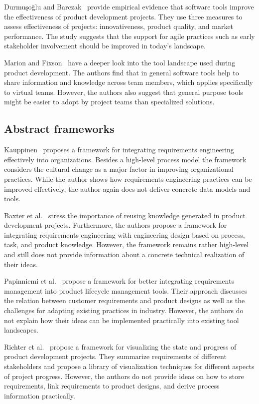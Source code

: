     Durmuşoğlu and Barczak~\cite{DURMUSOGLU2011321} provide empirical evidence that software tools improve the effectiveness of product development projects.
    They use three measures to assess effectiveness of projects: innovativeness, product quality, and market performance.
    The study suggests that the support for agile practices such as early stakeholder involvement should be improved in today's landscape.
    
    Marion and Fixson~\cite{marion_fixson_2019} have a deeper look into the tool landscape used during product development.
    The authors find that in general software tools help to share information and knowledge across team members, which applies specifically to virtual teams.
    However, the authors also suggest that general purpose tools might be easier to adopt by project teams than specialized solutions.
    
    \subsection*{Abstract frameworks}
    Kauppinen~\cite{Kauppinen2005} proposes a framework for integrating requirements engineering effectively into organizations.
    Besides a high-level process model the framework considers the cultural change as a major factor in improving organizational practices.
    While the author shows how requirements engineering practices can be improved effectively, the author again does not deliver concrete data models and tools.
    
    Baxter et al.~\cite{BAXTER2008585} stress the importance of reusing knowledge generated in product development projects.
    Furthermore, the authors propose a framework for integrating requirements engineering with engineering design based on process, task, and product knowledge.
    However, the framework remains rather high-level and still does not provide information about a concrete technical realization of their ideas.

    Papinniemi et al.~\cite{Jorma2014} propose a framework for better integrating requirements management into product lifecycle management tools.
    Their approach discusses the relation between customer requirements and product designs as well as the challenges for adapting existing practices in industry.
    However, the authors do not explain how their ideas can be implemented practically into existing tool landscapes.

    Richter et al.~\cite{RICHTER2020271} propose a framework for visualizing the state and progress of product development projects.
    They summarize requirements of different stakeholders and propose a library of visualization techniques for different aspects of project progress.
    However, the authors do not provide ideas on how to store requirements, link requirements to product designs, and derive process information practically.

